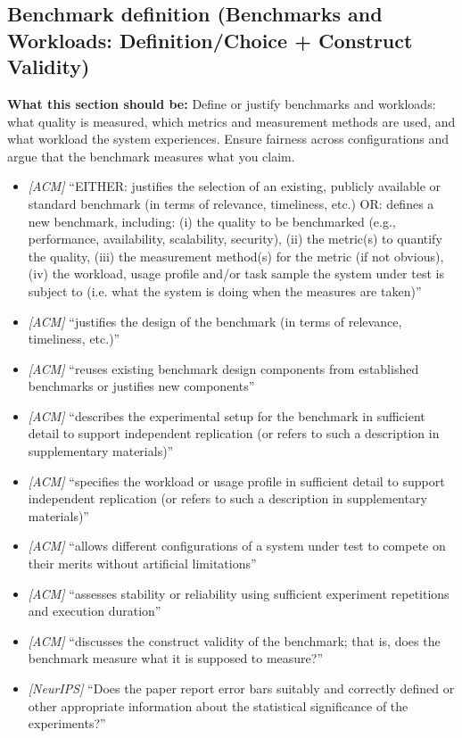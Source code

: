 \documentclass[11pt]{article}
\begin{document}
\subsection{Benchmark definition (Benchmarks and Workloads: Definition/Choice + Construct Validity)}
\noindent\textbf{What this section should be:}
Define or justify benchmarks and workloads: what quality is measured, which metrics and measurement methods are used, and what workload the system experiences. Ensure fairness across configurations and argue that the benchmark measures what you claim.
\begin{itemize}
  \item \textit{[ACM]} ``EITHER: justifies the selection of an existing, publicly available or standard benchmark (in terms of relevance, timeliness, etc.) OR: defines a new benchmark, including: (i) the quality to be benchmarked (e.g., performance, availability, scalability, security), (ii) the metric(s) to quantify the quality, (iii) the measurement method(s) for the metric (if not obvious), (iv) the workload, usage profile and/or task sample the system under test is subject to (i.e. what the system is doing when the measures are taken)''
  \item \textit{[ACM]} ``justifies the design of the benchmark (in terms of relevance, timeliness, etc.)''
  \item \textit{[ACM]} ``reuses existing benchmark design components from established benchmarks or justifies new components''
  \item \textit{[ACM]} ``describes the experimental setup for the benchmark in sufficient detail to support independent replication (or refers to such a description in supplementary materials)''
  \item \textit{[ACM]} ``specifies the workload or usage profile in sufficient detail to support independent replication (or refers to such a description in supplementary materials)''
  \item \textit{[ACM]} ``allows different configurations of a system under test to compete on their merits without artificial limitations''
  \item \textit{[ACM]} ``assesses stability or reliability using sufficient experiment repetitions and execution duration''
  \item \textit{[ACM]} ``discusses the construct validity of the benchmark; that is, does the benchmark measure what it is supposed to measure?''
  \item \textit{[NeurIPS]} ``Does the paper report error bars suitably and correctly defined or other appropriate information about the statistical significance of the experiments?''
\end{itemize}
\end{document}
